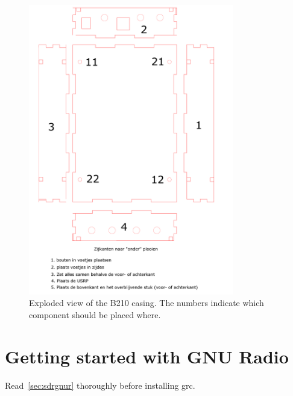 \begin{figure}[hbtp]
    \centering
    \includegraphics[clip, trim=0mm 50mm 0mm 0mm, width=0.8\textwidth]{figs/assemble_case.pdf}\caption{Exploded view of the B210 casing. The numbers indicate which component should be placed where.}\label{fig:b210-case}
\end{figure}

\section{Getting started with GNU Radio}


Read~\cref{sec:sdrgnur} thoroughly before installing \gls{grc}.


